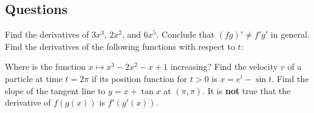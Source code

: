 \subsection*{Questions}
\begin{questions}
  \questioA Find the derivatives of $ 3x^3 $, $ 2x^2 $, and $ 6x^5 $. Conclude that $ (fg)' \neq f' g' $ in general.
  \questioA Find the derivatives of the following functions with respect to $ t $:
  \questioA Where is the function $ x \mapsto x^3 - 2x^2 - x + 1 $ increasing?
  \questioA Find the velocity $ v $ of a particle at time $ t = 2\pi $ if its position function for $ t > 0 $ is $ x = e^t - \sin t $.
  \questioA Find the slope of the tangent line to $ y = x + \tan x $ at $ (\pi, \pi) $.
  \questioA It is \textbf{not} true that the derivative of $ f(g(x)) $ is $ f'(g'(x)) $.
    \begin{parts}

\end{parts}
\end{questions}
